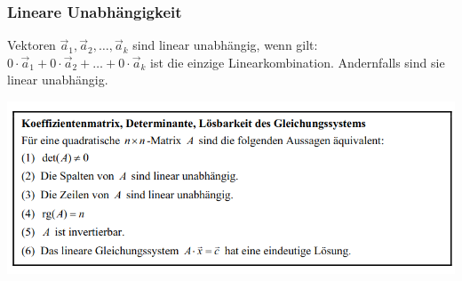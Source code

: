 \subsubsection{Lineare Unabhängigkeit}%
\label{ssub:Lineare Unabhängigkeit}
Vektoren $\vec{a}_1, \vec{a}_2, \dots, \vec{a}_k$ sind linear unabhängig, wenn gilt: $0 \cdot \vec{a}_1 + 0 \cdot \vec{a}_2 + \dots + 0 \cdot \vec{a}_k$ ist die einzige Linearkombination. Andernfalls sind sie linear unabhängig.

\begin{center}
  \includegraphics[width=0.9\linewidth]{images/koeffizientenmatrix.png}
\end{center}
